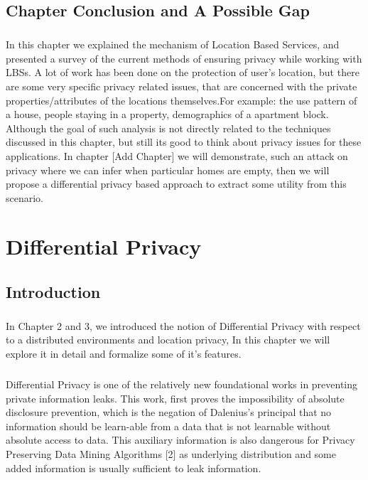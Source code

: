 \documentclass[12pt]{report}
\begin{document}
\section{Chapter Conclusion and A Possible Gap}
\paragraph{}
In this chapter we explained the mechanism of Location Based Services, and presented a survey of the current methods of ensuring privacy while working with LBSs. A lot of work has been done on the protection of user's location, but there are some very specific privacy related issues, that are concerned with the private properties/attributes of the locations themselves.For example: the use pattern of a house, people staying in a property, demographics of a apartment block. Although the goal of such analysis is not directly related to the techniques discussed in this chapter, but still its good to think about privacy issues for these applications. In chapter [Add Chapter] we will demonstrate, such an attack on privacy where we can infer when particular homes are empty, then we will propose a differential privacy based approach to extract some utility from this scenario.

\chapter{Differential Privacy}
\section{Introduction}
\paragraph{}
In Chapter 2 and 3, we introduced the notion of Differential Privacy with respect to a distributed environments and location privacy, In this chapter we will explore it in detail and formalize some of it's features. 

\paragraph{}
Differential Privacy \cite{Dwork:2006:DP:2097282.2097284} is one of the relatively new foundational works in preventing private information leaks. This work, first proves the impossibility of absolute disclosure prevention, which is the negation of Dalenius’s principal that no information should be learn-able from a data that is not learnable without absolute access to data. This auxiliary information is also dangerous for Privacy Preserving Data Mining Algorithms [2] as underlying distribution and some added information is usually sufficient to leak information.
\end{document}
